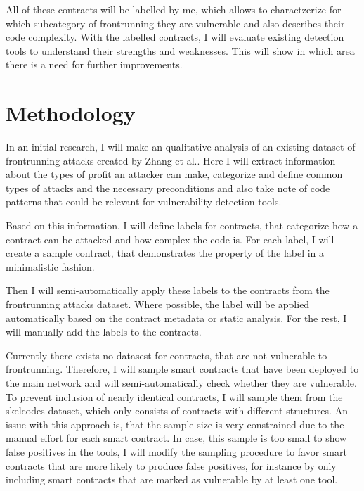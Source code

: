 \documentclass[paper=a4,fontsize=11pt,oneside,titlepage]{scrartcl}
\begin{document}
All of these contracts will be labelled by me, which allows to charactzerize for which subcategory of frontrunning they are vulnerable and also describes their code complexity. With the labelled contracts, I will evaluate existing detection tools to understand their strengths and weaknesses. This will show in which area there is a need for further improvements.

\iffalse
\begin{itemize}
\item What are the concrete goals and expected results?
\item How do these goals/results contribute to the problem of \autoref{sec:problem}?
\end{itemize}
\fi

\section{Methodology}
\label{sec:methods}

In an initial research, I will make an qualitative analysis of an existing dataset of frontrunning attacks created by Zhang et al.\cite{zhang_combatting_2023}. Here I will extract information about the types of profit an attacker can make, categorize and define common types of attacks and the necessary preconditions and also take note of code patterns that could be relevant for vulnerability detection tools.

Based on this information, I will define labels for contracts, that categorize how a contract can be attacked and how complex the code is. For each label, I will create a sample contract, that demonstrates the property of the label in a minimalistic fashion.

Then I will semi-automatically apply these labels to the contracts from the frontrunning attacks dataset\cite{zhang_combatting_2023}. Where possible, the label will be applied automatically based on the contract metadata or static analysis. For the rest, I will manually add the labels to the contracts.

Currently there exists no datasest for contracts, that are not vulnerable to frontrunning. Therefore, I will sample smart contracts that have been deployed to the main network and will semi-automatically check whether they are vulnerable. To prevent inclusion of nearly identical contracts, I will sample them from the skelcodes dataset\cite{di_angelo_evolution_2023}, which only consists of contracts with different structures. An issue with this approach is, that the sample size is very constrained due to the manual effort for each smart contract. In case, this sample is too small to show false positives in the tools, I will modify the sampling procedure to favor smart contracts that are more likely to produce false positives, for instance by only including smart contracts that are marked as vulnerable by at least one tool.
\end{document}
